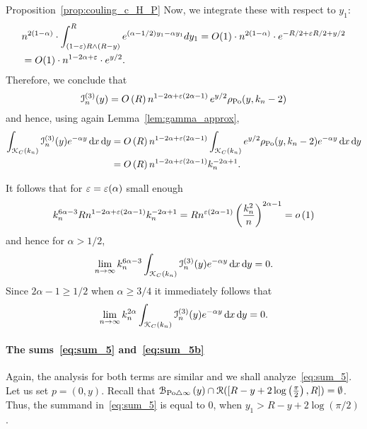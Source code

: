 \begin{proofof}{Proposition~\ref{prop:couling_c_H_P}}
Now, we integrate these with respect to $y_1$:
\begin{align*}
	&n^{2(1-\alpha)} \cdot \int_{(1-\varepsilon) R \wedge (R-y)}^{R} e^{(\alpha -1/2)y_1 - \alpha y_1} dy_1 
		=O(1) \cdot n^{2(1-\alpha)} \cdot e^{-R/2 + \varepsilon R/2  + y/2}  \\
	&= O(1) \cdot n^{1-2\alpha + \varepsilon} \cdot e^{y/2}.
\end{align*}
Therefore, we conclude that
\[
	\mathcal{I}_n^{(3)}(y) = O\left(R\right) n^{1-2\alpha +\varepsilon(2\alpha -1)} \, e^{y/2} \rho_{{\mathrm{Po}}}(y,k_n-2)
\]
and hence, using again Lemma~\ref{lem:gamma_approx},
\begin{align*}
	\int_{{\mathcal K}_{C}(k_n)} \mathcal{I}_n^{(3)}(y) e^{-\alpha y} \operatorname{\mathrm{d}\hspace{-2pt}} x \operatorname{\mathrm{d}\hspace{-2pt}} y
	&= O\left(R\right) n^{1-2\alpha +\varepsilon(2\alpha -1)} \int_{{\mathcal K}_{C}(k_n)} e^{y/2} 
		\rho_{{\mathrm{Po}}}(y,k_n-2) e^{-\alpha y} \operatorname{\mathrm{d}\hspace{-2pt}} x \operatorname{\mathrm{d}\hspace{-2pt}} y\\
	&= O\left(R\right) n^{1-2\alpha +\varepsilon(2\alpha -1)} k_n^{-2\alpha + 1}.
\end{align*}

It follows that for $\varepsilon = \varepsilon(\alpha)$ small enough
\[
	k_n^{6\alpha - 3} R n^{1-2\alpha +\varepsilon(2\alpha -1)} k_n^{-2\alpha + 1}
	= R n^{\varepsilon(2\alpha -1)} \left(\frac{k_n^2}{n}\right)^{2\alpha - 1} = o\left(1\right)
\]
and hence for $\alpha > 1/2$,
\[
	\lim_{n \to \infty} k_n^{6\alpha - 3} \int_{{\mathcal K}_{C}(k_n)} \mathcal{I}_n^{(3)}(y) e^{-\alpha y} \operatorname{\mathrm{d}\hspace{-2pt}} x \operatorname{\mathrm{d}\hspace{-2pt}} y = 0.
\]
Since $2\alpha - 1 \ge 1/2$ when $\alpha \ge 3/4$ it immediately follows that
\[
	\lim_{n \to \infty} k_n^{2\alpha} \int_{{\mathcal K}_{C}(k_n)} \mathcal{I}_n^{(3)}(y) e^{-\alpha y} \operatorname{\mathrm{d}\hspace{-2pt}} x \operatorname{\mathrm{d}\hspace{-2pt}} y = 0.
\]

\paragraph{The sums~\eqref{eq:sum_5} and~\eqref{eq:sum_5b}}

Again, the analysis for both terms are similar and we shall analyze~\eqref{eq:sum_5}. Let us set $p=(0,y)$. Recall that ${\mathcal B}_{{\mathrm{Po}} \bigtriangleup \infty}\left(y\right)\cap {\mathcal R}([R - y + 2 \log\left(\frac{\pi}{2}\right),R]) = \emptyset$. Thus, the summand in~\eqref{eq:sum_5} is equal to 0, when $y_1 > R - y + 2 \log (\pi/2)$. 


\end{proofof}

